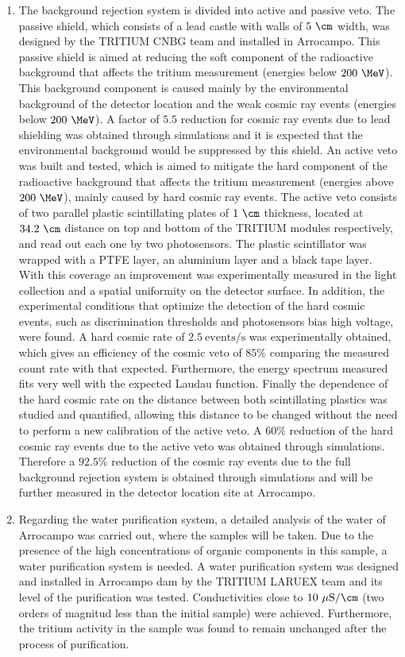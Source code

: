 \begin{enumerate}
\begin{enumerate}
\item{} The background rejection system is divided into active and passive veto. The passive shield, which consists of a lead castle with walls of $5~\cm$ width, was designed by the TRITIUM CNBG team and installed in Arrocampo. This passive shield is aimed at reducing the soft component of the radioactive background that affects the tritium measurement (energies below $200~\MeV$). This background component is caused mainly by the environmental background of the detector location and the weak cosmic ray events (energies below $200~\MeV$). A factor of $5.5$ reduction for cosmic ray events due to lead shielding was obtained through simulations and it is expected that the environmental background would be suppressed by this shield. An active veto was built and tested, which is aimed to mitigate the hard component of the radioactive background that affects the tritium measurement (energies above $200~\MeV$), mainly caused by hard cosmic ray events. The active veto consists of two parallel plastic scintillating plates of $1~\cm$ thickness, located at $34.2~\cm$ distance on top and bottom of the TRITIUM modules respectively, and read out each one by two photosensors. The plastic scintillator was wrapped with a PTFE layer, an aluminium layer and a black tape layer. With this coverage an improvement was experimentally measured in the light collection and a spatial uniformity on the detector surface. In addition, the experimental conditions that optimize the detection of the hard cosmic events, such as discrimination thresholds and photosensors bias high voltage, were found. A hard cosmic rate of $2.5~\text{events}/\text{s}$ was experimentally obtained, which gives an efficiency of the cosmic veto of $85\%$ comparing the measured count rate with that expected. Furthermore, the energy spectrum measured fits very well with the expected Laudau function. Finally the dependence of the hard cosmic rate on the distance between both scintillating plastics was studied and quantified, allowing this distance to be changed without the need to perform a new calibration of the active veto. A $60\%$ reduction of the hard cosmic ray events due to the active veto was obtained through simulations. Therefore a $92.5\%$ reduction of the cosmic ray events due to the full background rejection system is obtained through simulations and will be further measured in the detector location site at Arrocampo.

\item{} Regarding the water purification system, a detailed analysis of the water of Arrocampo was carried out, where the samples will be taken. Due to the presence of the high concentrations of organic components in this sample, a water purification system is needed. A water purification system was designed and installed in Arrocampo dam by the TRITIUM LARUEX team and its level of the purification was tested. Conductivities close to $10~\mu\text{S}/\cm$ (two orders of magnitud less than the initial sample) were achieved. Furthermore, the tritium activity in the sample was found to remain unchanged after the process of purification.


\end{enumerate}
\end{enumerate}
